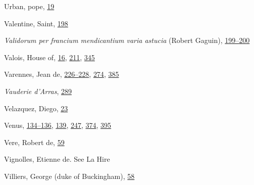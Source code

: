 Urban, pope,
\protect\hyperlink{08_Chapter_One__THE_PASSIONATE_INTE.xhtmlux5cux23page_19}{19}

Valentine, Saint,
\protect\hyperlink{13_Chapter_Six__THE_DEPICTION_OF_TH.xhtmlux5cux23page_198}{198}

\emph{Validorum per francium mendicantium varia astucia} (Robert
Gaguin),
\protect\hyperlink{13_Chapter_Six__THE_DEPICTION_OF_TH.xhtmlux5cux23page_199}{199--}\protect\hyperlink{13_Chapter_Six__THE_DEPICTION_OF_TH.xhtmlux5cux23page_200}{200}

Valois, House of,
\protect\hyperlink{08_Chapter_One__THE_PASSIONATE_INTE.xhtmlux5cux23page_16}{16},
\protect\hyperlink{14_Chapter_Seven__THE_PIOUS_PERSONA.xhtmlux5cux23page_211}{211},
\protect\hyperlink{21_Chapter_Thirteen__IMAGE_AND_WORD.xhtmlux5cux23page_345}{345}

Varennes, Jean de,
\protect\hyperlink{15_Chapter_Eight__RELIGIOUS_EXCITAT.xhtmlux5cux23page_226}{226--}\protect\hyperlink{15_Chapter_Eight__RELIGIOUS_EXCITAT.xhtmlux5cux23page_228}{228},
\protect\hyperlink{18_Chapter_Eleven__THE_FORMS_OF_THO.xhtmlux5cux23page_274}{274},
\protect\hyperlink{22_Chapter_Fourteen__THE_COMING_OF.xhtmlux5cux23page_385}{385}

\emph{Vauderie d'Arras},
\protect\hyperlink{18_Chapter_Eleven__THE_FORMS_OF_THO.xhtmlux5cux23page_289}{289}

Velazquez, Diego,
\protect\hyperlink{08_Chapter_One__THE_PASSIONATE_INTE.xhtmlux5cux23page_23}{23}

Venus,
\protect\hyperlink{11_Chapter_Four__THE_FORMS_OF_LOVE.xhtmlux5cux23page_134}{134--}\protect\hyperlink{11_Chapter_Four__THE_FORMS_OF_LOVE.xhtmlux5cux23page_136}{136},
\protect\hyperlink{11_Chapter_Four__THE_FORMS_OF_LOVE.xhtmlux5cux23page_139}{139},
\protect\hyperlink{16_Chapter_Nine__THE_DECLINE_OF_SYM.xhtmlux5cux23page_247}{247},
\protect\hyperlink{21_Chapter_Thirteen__IMAGE_AND_WORD.xhtmlux5cux23page_374}{374},
\protect\hyperlink{22_Chapter_Fourteen__THE_COMING_OF.xhtmlux5cux23page_395}{395}

Vere, Robert de,
\protect\hyperlink{09_Chapter_Two__THE_CRAVING_FOR_A_M.xhtmlux5cux23page_59}{59}

Vignolles, Etienne de. See La Hire

Villiers, George (duke of Buckingham),
\protect\hyperlink{09_Chapter_Two__THE_CRAVING_FOR_A_M.xhtmlux5cux23page_58}{58}

